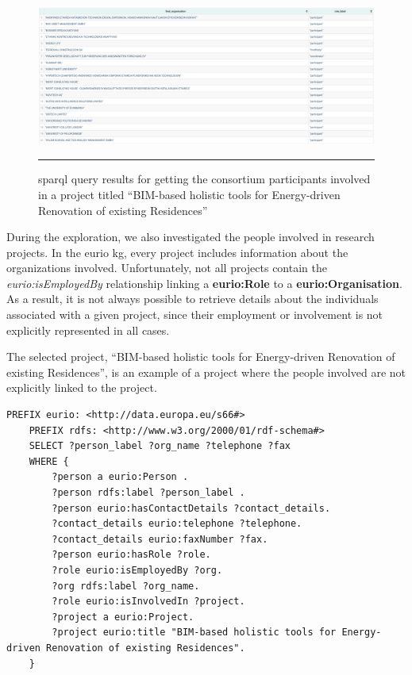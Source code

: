 \begin{figure}[htbp]
    \centering
 \includegraphics[width=.8\textwidth]{figures/architecture/sparql_example_project1_consortium_participants.png}
     \rule{35em}{0.5pt}
    \caption{\gls{sparql} query results for getting the consortium participants involved in a project titled ``BIM-based holistic tools for Energy-driven Renovation of existing Residences''}
 \label{fig:sparql_example_project1_consortium_participants}
\end{figure}

During the exploration, we also investigated the people involved in research projects.
In the \gls{eurio} \gls{kg}, every project includes information about the organizations involved.
Unfortunately, not all projects contain the \textit{eurio:isEmployedBy} relationship linking a \textbf{eurio:Role} to a \textbf{eurio:Organisation}.
As a result, it is not always possible to retrieve details about the individuals associated with a given project, since their employment or involvement is not explicitly represented in all cases.

The selected project, ``BIM-based holistic tools for Energy-driven Renovation of existing Residences'', is an example of a project where the people involved are not explicitly linked to the project.

\begin{lstlisting}[language=SPARQL, caption={\gls{sparql} query for getting full name, organisation, telephone, and fax of the people involved in a project titled ``BIM-based holistic tools for Energy-driven Renovation of existing Residences''}, label=lst:sparql_example_project1_people]
    PREFIX eurio: <http://data.europa.eu/s66#>
    PREFIX rdfs: <http://www.w3.org/2000/01/rdf-schema#>
    SELECT ?person_label ?org_name ?telephone ?fax
    WHERE {
        ?person a eurio:Person .
        ?person rdfs:label ?person_label .
        ?person eurio:hasContactDetails ?contact_details.
        ?contact_details eurio:telephone ?telephone.
        ?contact_details eurio:faxNumber ?fax.
        ?person eurio:hasRole ?role.
        ?role eurio:isEmployedBy ?org.
        ?org rdfs:label ?org_name.
        ?role eurio:isInvolvedIn ?project.
        ?project a eurio:Project.
        ?project eurio:title "BIM-based holistic tools for Energy-driven Renovation of existing Residences".
    }
\end{lstlisting}

